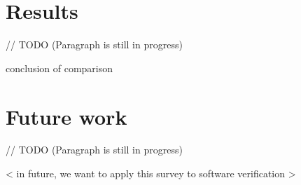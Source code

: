\documentclass[article]{aaltoseries}
\begin{document}

\section{Results}
\label{sec:results}

// TODO (Paragraph is still in progress)

conclusion of comparison


\section{Future work}
\label{sec:future_work}

// TODO (Paragraph is still in progress)

< in future, we want to apply this survey to software verification >






\end{document}
